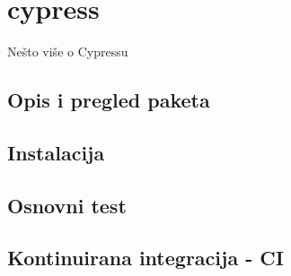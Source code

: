 \chapter{cypress}\label{ch_cypress}
Nešto više o Cypressu

\section{Opis i pregled paketa}

\section{Instalacija}

\section{Osnovni test}

\section{Kontinuirana integracija - CI}
